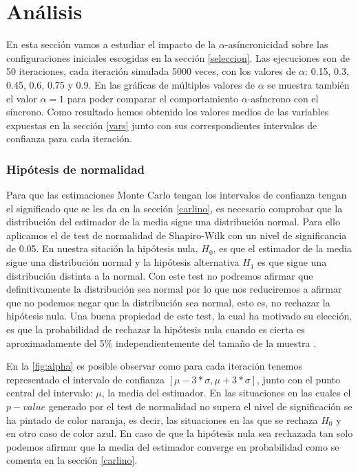 \documentclass[../proyecto.tex]{memoir}
\begin{document}
\chapter{Análisis}


En esta sección vamos a estudiar el impacto de la $\alpha$-asíncronicidad sobre las configuraciones iniciales escogidas en la sección \ref{seleccion}. Las ejecuciones son de 50 iteraciones, cada iteración simulada 5000 veces, con los valores de $\alpha$: 0.15, 0.3, 0.45, 0.6, 0.75 y 0.9. En las gráficas de múltiples valores de $\alpha$ se muestra también el valor $\alpha=1$ para poder comparar el comportamiento $\alpha$-asíncrono con el síncrono. Como resultado hemos obtenido los valores medios de las variables expuestas en la sección \ref{vars} junto con sus correspondientes intervalos de confianza para cada iteración.

\subsection{Hipótesis de normalidad} \label{normalidad}

Para que las estimaciones Monte Carlo tengan los intervalos de confianza tengan el significado que se les da en la sección \ref{carlino}, es necesario comprobar que la distribución del estimador de la media sigue una distribución normal. Para ello aplicamos el de test de normalidad de Shapiro-Wilk\cite{shapiro} con un nivel de significancia de 0.05. En nuestra sitación la hipótesis nula, $H_0$, es que el estimador de la media sigue una distribución normal y la hipótesis alternativa $H_1$ es que sigue una distribución distinta a la normal. Con este test no podremos afirmar que definitivamente la distribución sea normal por lo que nos reduciremos a afirmar que no podemos negar que la distribución sea normal, esto es, no rechazar la hipótesis nula. Una buena propiedad de este test, la cual ha motivado su elección, es que la probabilidad de rechazar la hipótesis nula cuando es cierta es aproximadamente del 5\% independientemente del tamaño de la muestra \cite{powertest}.

En la \autoref{fig:alpha} es posible observar como para cada iteración tenemos representado el intervalo de confianza $[\mu-3*\sigma, \mu+3*\sigma]$, junto con el punto central del intervalo: $\mu$, la media del estimador. En las situaciones en las cuales el $p-value$ generado por el test de normalidad no supera el nivel de significación se ha pintado de color naranja, es decir, las situaciones en las que se rechaza $H_0$ y en otro caso de color azul. En caso de que la hipótesis nula sea rechazada tan solo podemos afirmar que la media del estimador converge en probabilidad como se comenta en la sección \ref{carlino}.
\end{document}
